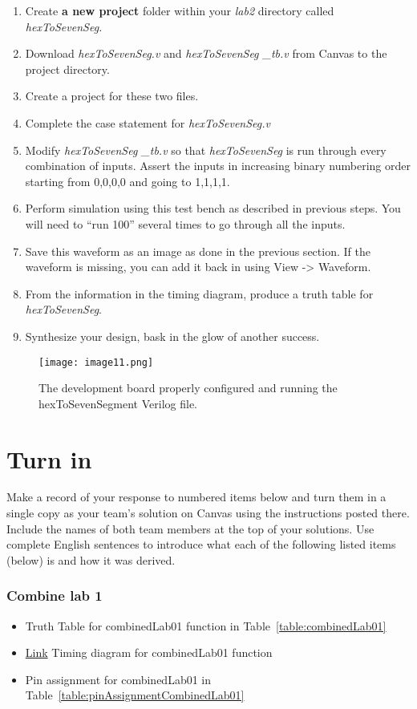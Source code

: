\begin{enumerate}
\item
  Create \textbf{a new project} folder within your \emph{lab2} directory
  called \emph{hexToSevenSeg.}
\item
  Download \emph{hexToSevenSeg.v} and \emph{hexToSevenSeg \_tb.v} from
  Canvas to the project directory.
\item
  Create a project for these two files.
\item
  \protect\hypertarget{Hex2Seven_Verilog}{}{}Complete the case statement
  for \emph{hexToSevenSeg.v}
\item
  Modify \emph{hexToSevenSeg \_tb.v} so that \emph{hexToSevenSeg} is run
  through every combination of inputs. Assert the inputs in increasing
  binary numbering order starting from 0,0,0,0 and going to 1,1,1,1.
\item
  Perform simulation using this test bench as described in previous
  steps. You will need to ``run 100'' several times to go through all
  the inputs.
\item
  \protect\hypertarget{Hex2Seven_Waveform}{}{}Save this waveform as an
  image as done in the previous section. If the waveform is missing, you
  can add it back in using View -\textgreater{} Waveform.
\item
  From the information in the timing diagram, produce a truth table for
  \emph{hexToSevenSeg}.
\item
  Synthesize your design, bask in the glow of another success.
\end{enumerate}

\begin{figure}[ht]
\texttt{[image: image11.png]}
\caption{The development board properly configured and running the hexToSevenSegment Verilog file.}
\end{figure}

\section{Turn in}

Make a record of your response to numbered items below and turn them in
a single copy as your team's solution on Canvas using the instructions
posted there. Include the names of both team members at the top of your
solutions. Use complete English sentences to introduce what each of the
following listed items (below) is and how it was derived.

\subsubsection{Combine lab 1} 
\begin{itemize}
\item Truth Table for combinedLab01 function in Table~\ref{table:combinedLab01}
\item \protect\hyperlink{CombinedLab01_Waveform}{Link} Timing diagram for combinedLab01 function
\item  Pin assignment for combinedLab01 in Table~\ref{table:pinAssignmentCombinedLab01}
\end{itemize}

